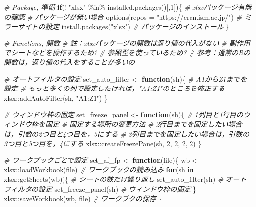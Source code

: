 \documentclass[
]{article}
\newenvironment{Shaded}{\begin{snugshade}}{\end{snugshade}}
\newcommand{\AttributeTok}[1]{\textcolor[rgb]{0.77,0.63,0.00}{#1}}
\newcommand{\CommentTok}[1]{\textcolor[rgb]{0.56,0.35,0.01}{\textit{#1}}}
\newcommand{\ControlFlowTok}[1]{\textcolor[rgb]{0.13,0.29,0.53}{\textbf{#1}}}
\newcommand{\DecValTok}[1]{\textcolor[rgb]{0.00,0.00,0.81}{#1}}
\newcommand{\FunctionTok}[1]{\textcolor[rgb]{0.00,0.00,0.00}{#1}}
\newcommand{\NormalTok}[1]{#1}
\newcommand{\OtherTok}[1]{\textcolor[rgb]{0.56,0.35,0.01}{#1}}
\newcommand{\SpecialCharTok}[1]{\textcolor[rgb]{0.00,0.00,0.00}{#1}}
\newcommand{\StringTok}[1]{\textcolor[rgb]{0.31,0.60,0.02}{#1}}
\begin{document}
\begin{Shaded}
\begin{Highlighting}[]
  \CommentTok{\# Package, 準備}
\ControlFlowTok{if}\NormalTok{(}\SpecialCharTok{!} \StringTok{"xlsx"} \SpecialCharTok{\%in\%} \FunctionTok{installed.packages}\NormalTok{()[,}\DecValTok{1}\NormalTok{])\{  }\CommentTok{\# xlsxパッケージ有無の確認}
  \CommentTok{\# パッケージが無い場合}
  \FunctionTok{options}\NormalTok{(}\AttributeTok{repos =} \StringTok{"https://cran.ism.ac.jp/"}\NormalTok{) }\CommentTok{\# ミラーサイトの設定}
  \FunctionTok{install.packages}\NormalTok{(}\StringTok{"xlsx"}\NormalTok{)                   }\CommentTok{\# パッケージのインストール}
\NormalTok{\}}

  \CommentTok{\# Functions, 関数}
  \CommentTok{\#   註：xlsxパッケージの関数は返り値の代入がない}
  \CommentTok{\#         副作用でシートなどを操作するため?}
  \CommentTok{\#         参照型を使っているため?}
  \CommentTok{\#   参考：通常のRの関数は，返り値の代入をすることが多いの}

  \CommentTok{\# オートフィルタの設定}
\NormalTok{set\_auto\_filter }\OtherTok{\textless{}{-}} \ControlFlowTok{function}\NormalTok{(sh)\{}
  \CommentTok{\# A1からZ1までを設定}
  \CommentTok{\#   もっと多くの列で設定したければ，"A1:Z1"のところを修正する}
\NormalTok{  xlsx}\SpecialCharTok{::}\FunctionTok{addAutoFilter}\NormalTok{(sh, }\StringTok{"A1:Z1"}\NormalTok{)}
\NormalTok{\}}

  \CommentTok{\# ウィンドウ枠の固定}
\NormalTok{set\_freeze\_panel }\OtherTok{\textless{}{-}} \ControlFlowTok{function}\NormalTok{(sh)\{}
  \CommentTok{\# 1列目と1行目のウィンドウ枠を固定}
  \CommentTok{\#   固定する場所の変更方法}
  \CommentTok{\#     2行目までを固定したい場合は，引数の2つ目と4つ目を，3にする}
  \CommentTok{\#     3列目までを固定したい場合は，引数の3つ目と5つ目を，4にする}
\NormalTok{  xlsx}\SpecialCharTok{::}\FunctionTok{createFreezePane}\NormalTok{(sh, }\DecValTok{2}\NormalTok{, }\DecValTok{2}\NormalTok{, }\DecValTok{2}\NormalTok{, }\DecValTok{2}\NormalTok{)}
\NormalTok{\}}

  \CommentTok{\# ワークブックごとで設定}
\NormalTok{set\_af\_fp }\OtherTok{\textless{}{-}} \ControlFlowTok{function}\NormalTok{(file)\{}
\NormalTok{  wb }\OtherTok{\textless{}{-}}\NormalTok{ xlsx}\SpecialCharTok{::}\FunctionTok{loadWorkbook}\NormalTok{(file)   }\CommentTok{\# ワークブックの読み込み}
  \ControlFlowTok{for}\NormalTok{(sh }\ControlFlowTok{in}\NormalTok{ xlsx}\SpecialCharTok{::}\FunctionTok{getSheets}\NormalTok{(wb))\{  }\CommentTok{\# シートの数だけ繰り返し}
    \FunctionTok{set\_auto\_filter}\NormalTok{(sh)            }\CommentTok{\#   オートフィルタの設定}
    \FunctionTok{set\_freeze\_panel}\NormalTok{(sh)           }\CommentTok{\#   ウィンドウ枠の固定}
\NormalTok{  \}}
\NormalTok{  xlsx}\SpecialCharTok{::}\FunctionTok{saveWorkbook}\NormalTok{(wb, file)     }\CommentTok{\# ワークブクの保存}
\NormalTok{\}}


\end{Highlighting}
\end{Shaded}
\end{document}

